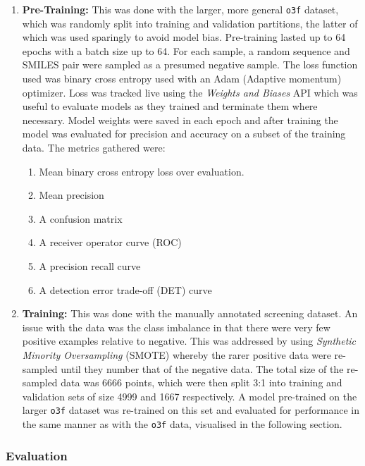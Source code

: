 \documentclass{article}
\begin{document}
\begin{enumerate}
	\item \textbf{Pre-Training:} This was done with the larger, more general \texttt{o3f} dataset, which was randomly split into training and validation partitions, the latter of which was used sparingly to avoid model bias.
	Pre-training lasted up to 64 epochs with a batch size up to 64.
	For each sample, a random sequence and SMILES pair were sampled as a presumed negative sample.
	The loss function used was binary cross entropy used with an Adam (Adaptive momentum) optimizer.
		Loss was tracked live using the \textit{Weights and Biases} API which was useful to evaluate models as they trained and terminate them where necessary.
	Model weights were saved in each epoch and after training the model was evaluated for precision and accuracy on a subset of the training data.
	The metrics gathered were: 

		\begin{enumerate}
			\item Mean binary cross entropy loss over evaluation.
			\item Mean precision
			\item A confusion matrix
			\item A receiver operator curve (ROC)
			\item A precision recall curve
			\item A detection error trade-off (DET) curve
		\end{enumerate}

	\item \textbf{Training:} This was done with the manually annotated screening dataset.
	An issue with the data was the class imbalance in that there were very few positive examples relative to negative.
		This was addressed by using \textit{Synthetic Minority Oversampling} (SMOTE) whereby the rarer positive data were re-sampled until they number that of the negative data.
	The total size of the re-sampled data was 6666 points, which were then split 3:1 into training and validation sets of size 4999 and 1667 respectively.
		A model pre-trained on the larger \texttt{o3f} dataset was re-trained on this set and evaluated for performance in the same manner as with the \texttt{o3f} data, visualised in the following section.
\end{enumerate}

\subsubsection{Evaluation}
\end{document}
